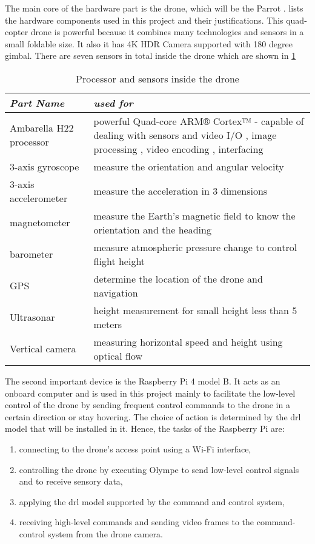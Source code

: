 \documentclass[../main.tex]{subfiles}
\begin{document}
The main core of the hardware part is the drone, 
which will be the Parrot \anafi.
 lists the hardware components
used in this project and their justifications. This quad-copter
drone is powerful because it combines many technologies 
and sensors in a small foldable size. It also it has 4K HDR Camera supported 
with 180 degree gimbal. 
There are seven sensors in total inside the drone which are shown in 
\cref{tab:sensors-table} 


\begin{table}[H]
	\centering
	\caption{Processor and sensors inside the drone}
	\label{tab:sensors-table}  
	\begin{tabular}{ p{4cm} p{8cm} }
		\toprule
		\textit{Part Name} 
		& \textit{used for}  \\ 
		
		\midrule
		Ambarella H22 
		processor
		& powerful Quad-core ARM® Cortex™ - capable of dealing with sensors and video I/O , 
		image processing , video encoding , interfacing \\ 
		3-axis gyroscope
		& measure the orientation and angular velocity  \\ 
		3-axis accelerometer
		& measure the acceleration in 3 dimensions  \\ 
		magnetometer 
		& measure the Earth's magnetic field to know the orientation and the heading   \\ 
				barometer 
		& measure atmospheric pressure change to control flight height   \\ 
				GPS 
		& determine the location of the drone and navigation  \\ 
				Ultrasonar 
		&  height measurement for small height less than 5 meters  \\ 
				Vertical camera 
		&  measuring horizontal speed and height using optical flow \\ 
        \bottomrule
    \end{tabular}
\end{table}   

The second important device is the Raspberry Pi 4 model B. It 
acts as an onboard computer and is used in this project
mainly to facilitate the low-level control of the drone
by sending frequent control commands to the drone
in a certain direction or stay hovering.
The choice of action is determined by the \gls{drl}
model that will be installed in it.
Hence, the tasks of the Raspberry Pi are: 

\begin{enumerate}
	\item connecting to the drone's access point 
	using a Wi-Fi interface,
	\item controlling the drone 
	by executing Olympe to send low-level control signals 
	and to receive sensory data,
	\item applying the \gls{drl} model supported by 
	the command and control system,
	\item receiving high-level commands and sending video 
	frames to the command-control system from the drone camera.
\end{enumerate}
 
\end{document}
